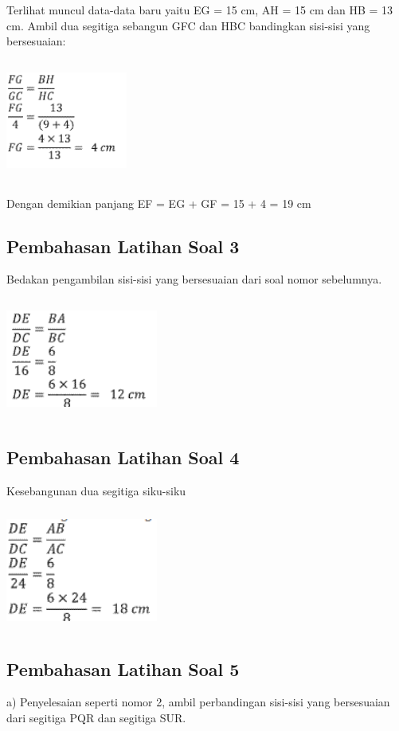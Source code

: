 \documentclass[11pt,fleqn]{book} %
\begin{document}
Terlihat muncul  data-data baru yaitu EG = 15 cm, AH = 15 cm dan HB = 13 cm. Ambil dua segitiga sebangun GFC dan HBC bandingkan sisi-sisi yang bersesuaian: 

\includegraphics[width = 4cm, height= 4cm]{Pictures/a34.png} 

Dengan demikian panjang EF = EG + GF = 15 + 4 = 19 cm
 
\subsection{Pembahasan Latihan Soal 3}

Bedakan pengambilan sisi-sisi yang bersesuaian dari soal nomor sebelumnya. 

\includegraphics[width = 5cm, height= 4cm]{Pictures/a35.png}

\subsection{Pembahasan Latihan Soal 4}
Kesebangunan dua segitiga siku-siku 

\includegraphics[width = 5cm, height= 4cm]{Pictures/a36.png}

\subsection{Pembahasan Latihan Soal 5}
a) Penyelesaian seperti nomor 2, ambil perbandingan sisi-sisi yang bersesuaian dari segitiga PQR dan segitiga SUR. 
\end{document}
